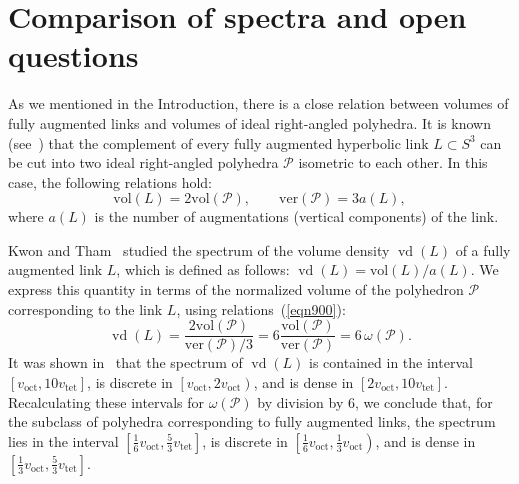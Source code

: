 \documentclass{amsart}
\newcommand{\vol}{\mathrm{vol}}
\newcommand{\voct}{v_{\mathrm{oct}}}
\newcommand{\vtet}{v_{\mathrm{tet}}}
\newcommand{\ver}{\mathrm{ver}}
\begin{document}
\section{Comparison of spectra and open questions} \label{comparison}

As we mentioned in the Introduction, there is a close relation between volumes of fully augmented links and volumes of ideal right-angled polyhedra. It is known (see~\cite{La04, Pur2011, VeEg24}) that the complement of every fully augmented hyperbolic link $L \subset S^3$ can be cut into two ideal right-angled polyhedra $\mathcal P$ isometric to each other.
In this case, the following relations hold:
\begin{equation} \label{eqn900}
\vol(L) = 2\vol(\mathcal P), \qquad \ver(\mathcal P) = 3  a(L),
\end{equation}
where $a(L)$ is the number of augmentations (vertical components) of the link.
	
Kwon and Tham~\cite{KwonTham} studied the spectrum of the volume density $\operatorname{vd}(L)$ of a fully augmented link $L$, which is defined as follows: $\operatorname{vd}(L) = \vol(L)/a(L)$.
We express this quantity in terms of the normalized volume of the polyhedron $\mathcal P$ corresponding to the link $L$, using relations~(\ref{eqn900}):
$$
\operatorname{vd}(L) = \frac{2\vol(\mathcal P)}{ \ver(\mathcal P)/3} = 6 \frac{\vol(\mathcal P)}{\ver(\mathcal P)} = 6 \, \omega(\mathcal P).
$$
It was shown in~\cite{KwonTham} that the spectrum of $\operatorname{vd}(L)$ is contained in the interval $\left[ \voct, 10\vtet \right]$, is discrete in $\left[ \voct, 2\voct \right)$, and is dense in $\left[ 2\voct, 10\vtet \right]$. Recalculating these intervals for $\omega(\mathcal P)$ by division by $6$, we conclude that, for the subclass of polyhedra corresponding to fully augmented links, the spectrum lies in the interval $\left[\frac{1}{6} \voct, \frac{5}{3} \vtet \right]$, is discrete in $\left[ \frac{1}{6} \voct, \frac{1}{3} \voct \right)$, and is dense in $\left[ \frac{1}{3} \voct, \frac{5}{3} \vtet \right]$.
	
\end{document}
